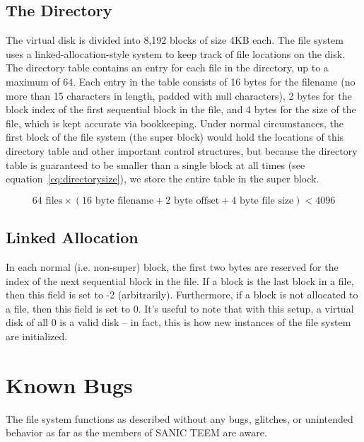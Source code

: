 \documentclass[paper=a4, fontsize=11pt]{scrartcl}
\begin{document}
\subsection*{The Directory}
The virtual disk is divided into 8,192 blocks of size 4KB each. The file system uses a linked-allocation-style system to keep track of file locations on the disk. The directory table contains an entry for each file in the directory, up to a maximum of 64. Each entry in the table consists of 16 bytes for the filename (no more than 15 characters in length, padded with null characters), 2 bytes for the block index of the first sequential block in the file, and 4 bytes for the size of the file, which is kept accurate via bookkeeping. Under normal circumstances, the first block of the file system (the super block) would hold the locations of this directory table and other important control structures, but because the directory table is guaranteed to be smaller than a single block at all times (see equation~\ref{eq:directorysize}), we store the entire table in the super block.

\begin{equation}
  \label{eq:directorysize}
  64 \textrm{ files} \times \left( 16 \textrm{ byte filename} + 2 \textrm{ byte offset} + 4 \textrm{ byte file size} \right) < 4096
\end{equation}

\subsection*{Linked Allocation}
In each normal (i.e. non-super) block, the first two bytes are reserved for the index of the next sequential block in the file. If a block is the last block in a file, then this field is set to -2 (arbitrarily). Furthermore, if a block is not allocated to a file, then this field is set to 0. It's useful to note that with this setup, a virtual disk of all 0 is a valid disk -- in fact, this is how new instances of the file system are initialized.

\section*{Known Bugs}
The file system functions as described without any bugs, glitches, or unintended behavior as far as the members of SANIC TEEM are aware.
\end{document}
